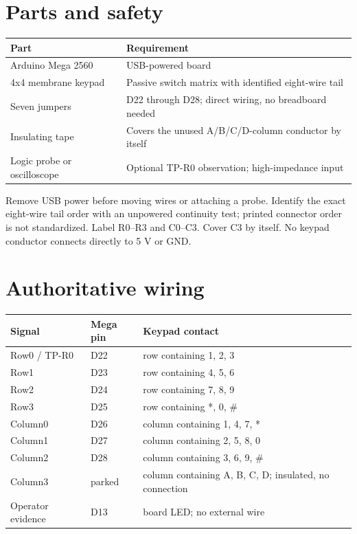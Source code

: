 \documentclass[11pt]{article}
\begin{document}
\section{Parts and safety}

\begin{tabularx}{\linewidth}{@{}l X@{}}
\toprule
Part & Requirement\\
\midrule
Arduino Mega 2560 & USB-powered board\\
4x4 membrane keypad & Passive switch matrix with identified eight-wire tail\\
Seven jumpers & D22 through D28; direct wiring, no breadboard needed\\
Insulating tape & Covers the unused A/B/C/D-column conductor by itself\\
Logic probe or oscilloscope & Optional TP-R0 observation; high-impedance input\\
\bottomrule
\end{tabularx}

Remove USB power before moving wires or attaching a probe. Identify the exact
eight-wire tail order with an unpowered continuity test; printed connector
order is not standardized. Label R0--R3 and C0--C3. Cover C3 by itself. No
keypad conductor connects directly to 5 V or GND.

\section{Authoritative wiring}

\begin{tabularx}{\linewidth}{@{}l l X@{}}
\toprule
Signal & Mega pin & Keypad contact\\
\midrule
Row0 / TP-R0 & D22 & row containing 1, 2, 3\\
Row1 & D23 & row containing 4, 5, 6\\
Row2 & D24 & row containing 7, 8, 9\\
Row3 & D25 & row containing *, 0, \#\\
Column0 & D26 & column containing 1, 4, 7, *\\
Column1 & D27 & column containing 2, 5, 8, 0\\
Column2 & D28 & column containing 3, 6, 9, \#\\
Column3 & parked & column containing A, B, C, D; insulated, no connection\\
Operator evidence & D13 & board LED; no external wire\\
\bottomrule
\end{tabularx}
\end{document}
